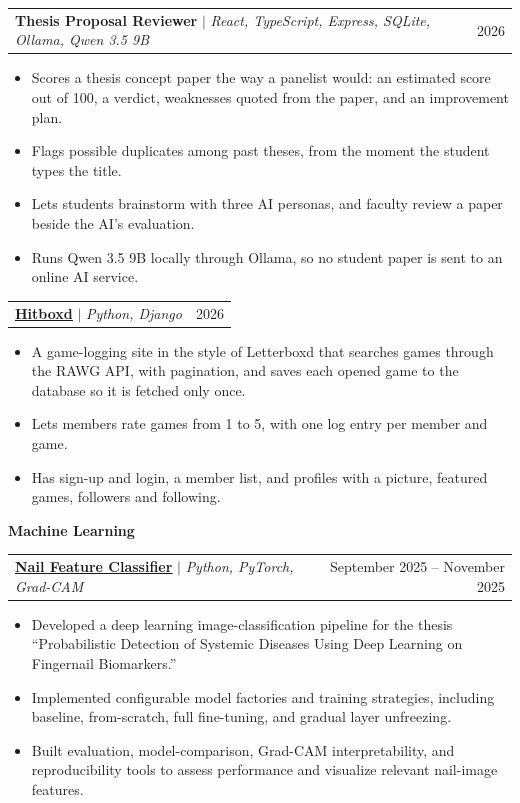 \documentclass[letterpaper,11pt]{article}
\makeatletter
\newcommand{\resumeItem}[1]{
  \item\small{
    {#1 \vspace{-2pt}}
  }
}
\newcommand{\resumeProjectHeading}[2]{
    \item
    \begin{tabular*}{0.97\textwidth}{l@{\extracolsep{\fill}}r}
      \small#1 & #2 \\
    \end{tabular*}\vspace{-7pt}
}
\newcommand{\resumeItemListStart}{\begin{itemize}}
\newcommand{\resumeItemListEnd}{\end{itemize}\vspace{-5pt}}
\let\oldProjectHeading\resumeProjectHeading
\renewcommand{\resumeProjectHeading}[2]{\needspace{4\baselineskip}\oldProjectHeading{#1}{#2}}
\newcommand{\resumeGroup}[1]{\item[]\hspace{-0.15in}\textbf{\small #1}\vspace{-4pt}}
\makeatother
\begin{document}
      \resumeProjectHeading
        {\textbf{Thesis Proposal Reviewer} $|$
        \emph{React, TypeScript, Express, SQLite, Ollama, Qwen 3.5 9B}}
        {2026}
          \resumeItemListStart
            \resumeItem{Scores a thesis concept paper the way a panelist would: an estimated score out of 100, a verdict, weaknesses quoted from the paper, and an improvement plan.}
            \resumeItem{Flags possible duplicates among past theses, from the moment the student types the title.}
            \resumeItem{Lets students brainstorm with three AI personas, and faculty review a paper beside the AI's evaluation.}
            \resumeItem{Runs Qwen 3.5 9B locally through Ollama, so no student paper is sent to an online AI service.}
          \resumeItemListEnd

      \resumeProjectHeading
        {\textbf{\href{https://github.com/Shibarashii/hitboxd}{\underline{Hitboxd}}} $|$
        \emph{Python, Django}}
        {2026}
          \resumeItemListStart
            \resumeItem{A game-logging site in the style of Letterboxd that searches games through the RAWG API, with pagination, and saves each opened game to the database so it is fetched only once.}
            \resumeItem{Lets members rate games from 1 to 5, with one log entry per member and game.}
            \resumeItem{Has sign-up and login, a member list, and profiles with a picture, featured games, followers and following.}
          \resumeItemListEnd

      \resumeGroup{Machine Learning}

      \resumeProjectHeading
        {\textbf{\href{https://github.com/Shibarashii/nail-feature-classifier}{\underline{Nail Feature Classifier}}} $|$
        \emph{Python, PyTorch, Grad-CAM}}
        {September 2025 -- November 2025}
          \resumeItemListStart
            \resumeItem{Developed a deep learning image-classification pipeline for the thesis ``Probabilistic Detection of Systemic Diseases Using Deep Learning on Fingernail Biomarkers.''}
            \resumeItem{Implemented configurable model factories and training strategies, including baseline, from-scratch, full fine-tuning, and gradual layer unfreezing.}
            \resumeItem{Built evaluation, model-comparison, Grad-CAM interpretability, and reproducibility tools to assess performance and visualize relevant nail-image features.}
          \resumeItemListEnd
\end{document}
